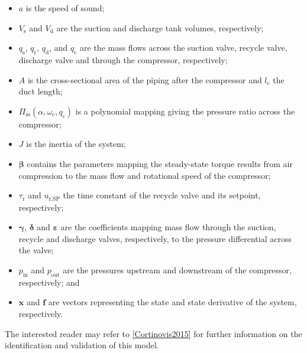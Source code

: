 \begin{itemize}[noitemsep]
  \item $a$ is the speed of sound; 
  \item $V_\text{s}$ and $V_\text{d}$ are the suction and discharge tank volumes, respectively;
  \item $q_\text{s}$, $q_\text{r}$, $q_\text{d}$, and $q_\text{c}$ are the mass flows across the suction valve, recycle valve, discharge valve and through the compressor, respectively;
  \item $A$ is the cross-sectional area of the piping after the compressor and $l_\text{c}$ the duct length;
  \item $\Pi_{\text{ss}}\left(\alpha,\omega_\text{c}, q_\text{c} \right)$ is a polynomial mapping giving the pressure ratio across the compressor;
  \item $J$ is the inertia of the system;
  \item $\bm{\beta}$ contains the parameters mapping the steady-state torque results from air compression to the mass flow and rotational speed of the compressor;
  \item $\tau_\text{r}$ and $u_{\text{r,SP}}$ the time constant of the recycle valve and its setpoint, respectively;
  \item $\bm{\gamma}$, $\bm{\delta}$ and $\bm{\varepsilon}$ are the coefficients mapping mass flow through the suction, recycle and discharge valves, respectively, to the pressure differential across the valve;
  \item $p_{\text{in}}$ and $p_{\text{out}}$ are the pressures upstream and downstream of the compressor, respectively; and
  \item $\bm{x}$ and $\bm{f}$ are vectors representing the state and state derivative of the system, respectively.
\end{itemize}

The interested reader may refer to \ref{Cortinovis2015} for further information on the identification and validation of this model.



